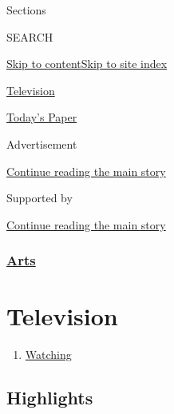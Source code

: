Sections

SEARCH

\protect\hyperlink{site-content}{Skip to
content}\protect\hyperlink{site-index}{Skip to site index}

\href{https://www.nytimes.com/section/arts/television}{Television}

\href{https://myaccount.nytimes.com/auth/login?response_type=cookie\&client_id=vi}{}

\href{https://www.nytimes.com/section/todayspaper}{Today's Paper}

Advertisement

\protect\hyperlink{after-top}{Continue reading the main story}

Supported by

\protect\hyperlink{after-sponsor}{Continue reading the main story}

\hypertarget{arts}{%
\subsubsection{\texorpdfstring{\href{/section/arts}{Arts}}{Arts}}\label{arts}}

\hypertarget{television}{%
\section{Television}\label{television}}

\begin{enumerate}
\def\labelenumi{\arabic{enumi}.}
\tightlist
\item
  \href{/watching}{Watching}
\end{enumerate}

\hypertarget{highlights}{%
\subsection{Highlights}\label{highlights}}

